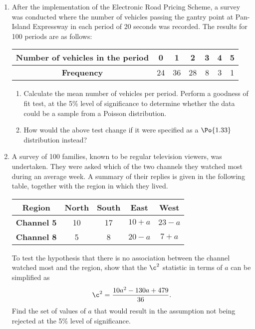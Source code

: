 \begin{problem}
    \begin{enumerate}
        \item After the implementation of the Electronic Road Pricing Scheme, a survey was conducted where the number of vehicles passing the gantry point at Pan-Island Expressway in each period of 20 seconds was recorded. The results for 100 periods are as follows:

        \begin{table}[H]
        \centering
        \begin{tabular}{|c|c|c|c|c|c|c|}
            \hline
            \textbf{Number of vehicles in the period} & 0 & 1 & 2 & 3 & 4 & 5 \\ \hline
            \textbf{Frequency} & 24 & 36 & 28 & 8 & 3 & 1 \\ \hline
        \end{tabular}
        \end{table}
        \begin{enumerate}
            \item Calculate the mean number of vehicles per period. Perform a goodness of fit test, at the 5\% level of significance to determine whether the data could be a sample from a Poisson distribution.
            \item How would the above test change if it were specified as a $\Po{1.33}$ distribution instead?
        \end{enumerate}
        \item A survey of 100 families, known to be regular television viewers, was undertaken. They were asked which of the two channels they watched most during an average week. A summary of their replies is given in the following table, together with the region in which they lived.
        
        \begin{table}[H]
            \centering
            \begin{tabular}{|c|c|c|c|c|}
                \hline
                \textbf{Region} & North & South & East & West \\ \hline
                \textbf{Channel 5} & 10 & 17 & $10 + a$ & $23 - a$ \\ \hline
                \textbf{Channel 8} & 5 & 8 & $20 - a$ & $7 + a$ \\ \hline
            \end{tabular}
        \end{table}

        To test the hypothesis that there is no association between the channel watched most and the region, show that the $\c^2$ statistic in terms of $a$ can be simplified as \[\c^2 = \frac{10a^2 - 130a + 479}{36}.\] Find the set of values of $a$ that would result in the assumption not being rejected at the 5\% level of significance.
    \end{enumerate}
\end{problem}
